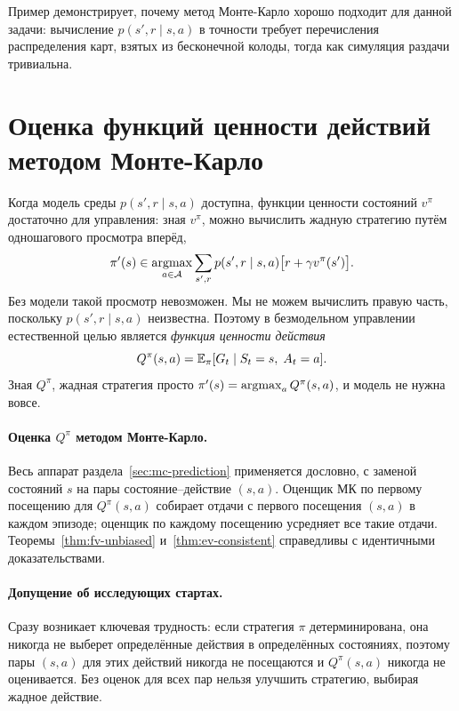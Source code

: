 Пример демонстрирует, почему метод Монте-Карло хорошо подходит для данной задачи: вычисление $p(s', r \mid s, a)$ в точности требует перечисления распределения карт, взятых из бесконечной колоды, тогда как симуляция раздачи тривиальна.


\section{Оценка функций ценности действий методом Монте-Карло}
\label{sec:mc-action-values}

Когда модель среды $p(s', r \mid s, a)$ доступна, функции ценности состояний $v^\pi$ достаточно для управления: зная $v^\pi$, можно вычислить жадную стратегию путём одношагового просмотра вперёд,
\[
  \pi'(s) \in \operatorname*{argmax}_{a \in \mathcal{A}} \sum_{s', r} p(s', r \mid s, a)\bigl[r + \gamma v^\pi(s')\bigr].
\]
Без модели такой просмотр невозможен.  Мы не можем вычислить правую часть, поскольку $p(s', r \mid s, a)$ неизвестна.  Поэтому в безмодельном управлении естественной целью является \emph{функция ценности действия}
\begin{equation}
  \label{eq:mc-q-def}
  Q^\pi(s, a) = \operatorname{\mathbb{E}}_\pi[G_t \mid S_t = s,\; A_t = a].
\end{equation}
Зная $Q^\pi$, жадная стратегия просто $\pi'(s) = \operatorname*{argmax}_{a} Q^\pi(s, a)$, и модель не нужна вовсе.

\paragraph{Оценка $Q^\pi$ методом Монте-Карло.}  Весь аппарат раздела~\ref{sec:mc-prediction} применяется дословно, с заменой состояний $s$ на пары состояние--действие $(s, a)$.  Оценщик МК по первому посещению для $Q^\pi(s, a)$ собирает отдачи с первого посещения $(s, a)$ в каждом эпизоде; оценщик по каждому посещению усредняет все такие отдачи.  Теоремы~\ref{thm:fv-unbiased} и~\ref{thm:ev-consistent} справедливы с идентичными доказательствами.

\paragraph{Допущение об исследующих стартах.}
Сразу возникает ключевая трудность: если стратегия $\pi$ детерминирована, она никогда не выберет определённые действия в определённых состояниях, поэтому пары $(s, a)$ для этих действий никогда не посещаются и $Q^\pi(s, a)$ никогда не оценивается.  Без оценок для всех пар нельзя улучшить стратегию, выбирая жадное действие.

